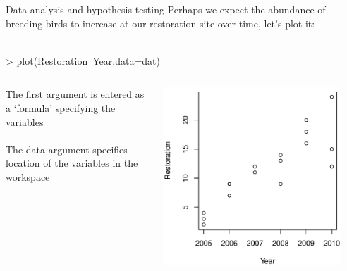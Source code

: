 \documentclass[xcolor=svgnames]{beamer}
\begin{document}
\begin{frame}[fragile]{Data analysis and hypothesis testing}
Perhaps we expect the abundance of breeding birds to increase at our restoration site over time, let's plot it:\\~\\
\begin{Schunk}
\begin{Sinput}
> plot(Restoration~Year,data=dat)
\end{Sinput}
\end{Schunk}
\vspace{-0.13in}
\begin{columns}
\begin{column}{0.5\textwidth}
The first argument is entered as a `formula' specifying the variables\\~\\
The data argument specifies location of the variables in the workspace
\end{column}
\begin{column}{0.5\textwidth}
\begin{center}
\includegraphics[width=0.9\textwidth]{R_for_data_analysis-reg1.pdf}
\end{center}
\end{column}
\end{columns}
\end{frame}
\end{document}
